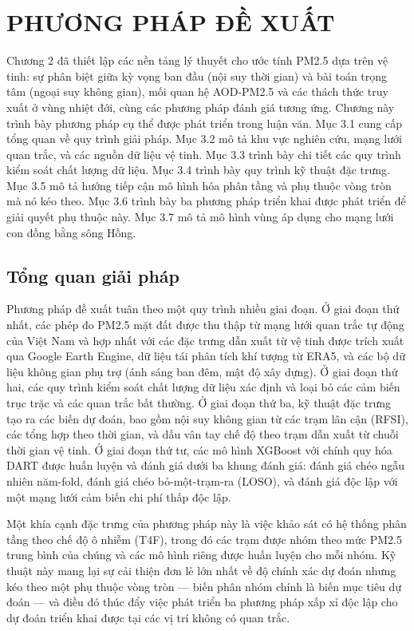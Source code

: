 \chapter{PHƯƠNG PHÁP ĐỀ XUẤT}
\label{chuong3}


Chương 2 đã thiết lập các nền tảng lý thuyết cho ước tính PM2.5 dựa trên vệ tinh: sự phân biệt giữa kỳ vọng ban đầu (nội suy thời gian) và bài toán trọng tâm (ngoại suy không gian), mối quan hệ AOD-PM2.5 và các thách thức truy xuất ở vùng nhiệt đới, cùng các phương pháp đánh giá tương ứng. Chương này trình bày phương pháp cụ thể được phát triển trong luận văn. Mục 3.1 cung cấp tổng quan về quy trình giải pháp. Mục 3.2 mô tả khu vực nghiên cứu, mạng lưới quan trắc, và các nguồn dữ liệu vệ tinh. Mục 3.3 trình bày chi tiết các quy trình kiểm soát chất lượng dữ liệu. Mục 3.4 trình bày quy trình kỹ thuật đặc trưng. Mục 3.5 mô tả hướng tiếp cận mô hình hóa phân tầng và phụ thuộc vòng tròn mà nó kéo theo. Mục 3.6 trình bày ba phương pháp triển khai được phát triển để giải quyết phụ thuộc này. Mục 3.7 mô tả mô hình vùng áp dụng cho mạng lưới con đồng bằng sông Hồng.


\section{Tổng quan giải pháp}

Phương pháp đề xuất tuân theo một quy trình nhiều giai đoạn. Ở giai đoạn thứ nhất, các phép đo PM2.5 mặt đất được thu thập từ mạng lưới quan trắc tự động của Việt Nam và hợp nhất với các đặc trưng dẫn xuất từ vệ tinh được trích xuất qua Google Earth Engine, dữ liệu tái phân tích khí tượng từ ERA5, và các bộ dữ liệu không gian phụ trợ (ánh sáng ban đêm, mật độ xây dựng). Ở giai đoạn thứ hai, các quy trình kiểm soát chất lượng dữ liệu xác định và loại bỏ các cảm biến trục trặc và các quan trắc bất thường. Ở giai đoạn thứ ba, kỹ thuật đặc trưng tạo ra các biến dự đoán, bao gồm nội suy không gian từ các trạm lân cận (RFSI), các tổng hợp theo thời gian, và dấu vân tay chế độ theo trạm dẫn xuất từ chuỗi thời gian vệ tinh. Ở giai đoạn thứ tư, các mô hình XGBoost với chính quy hóa DART được huấn luyện và đánh giá dưới ba khung đánh giá: đánh giá chéo ngẫu nhiên năm-fold, đánh giá chéo bỏ-một-trạm-ra (LOSO), và đánh giá độc lập với một mạng lưới cảm biến chi phí thấp độc lập.

Một khía cạnh đặc trưng của phương pháp này là việc khảo sát có hệ thống phân tầng theo chế độ ô nhiễm (T4F), trong đó các trạm được nhóm theo mức PM2.5 trung bình của chúng và các mô hình riêng được huấn luyện cho mỗi nhóm. Kỹ thuật này mang lại sự cải thiện đơn lẻ lớn nhất về độ chính xác dự đoán nhưng kéo theo một phụ thuộc vòng tròn --- biến phân nhóm chính là biến mục tiêu dự đoán --- và điều đó thúc đẩy việc phát triển ba phương pháp xấp xỉ độc lập cho dự đoán triển khai được tại các vị trí không có quan trắc.


